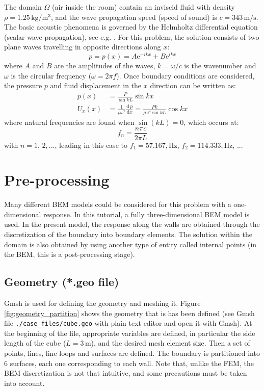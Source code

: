 \documentclass[a4]{article}
\begin{document}
The domain $\Omega$ (air inside the room) contain an inviscid fluid with density $\rho=1.25\,\mathrm{kg/m^3}$, and the wave propagation speed (speed of sound) is $c=343\,\mathrm{m/s}$. The basic acoustic phenomena is governed by the Helmholtz differential equation (scalar wave propagation), see e.g. \cite{dominguez,maeso}. For this problem, the solution consists of two plane waves travelling in opposite directions along $x$:
\begin{equation}
p=p\left(x\right) = A\mathrm{e}^{-ikx} + B\mathrm{e}^{ikx}
\end{equation}
where $A$ and $B$ are the amplitudes of the waves, $k=\omega/c$ is the wavenumber and $\omega$ is the circular frequency ($\omega=2\pi f$). Once boundary conditions are considered, the pressure $p$ and fluid displacement in the $x$ direction can be written as:
\begin{align}
p\left(x\right)   &= \frac{P}{\sin kL}\sin kx \\
U_x\left(x\right) &= \frac{1}{\rho\omega^2}\frac{\mathrm{d}\,p}{\mathrm{d}x} = \frac{Pk}{\rho\omega^2\sin kL}\cos kx
\end{align}
where natural frequencies are found when $\sin(kL)=0$, which occurs at:
\begin{equation}
f_n = \frac{n \pi c}{2 \pi L}
\end{equation}
with $n=1,\,2,...$, leading in this case to $f_1=57.167,\mathrm{Hz}$, $f_2=114.333,\mathrm{Hz}$, ...

\section{Pre-processing}

Many different BEM models could be considered for this problem with a one-dimensional response. In this tutorial, a fully three-dimensional BEM model is used. In the present model, the response along the walls are obtained through the discretization of the boundary into boundary elements. The solution within the domain is also obtained by using another type of entity called internal points (in the BEM, this is a post-processing stage).

\subsection{Geometry (*.geo file)}

Gmsh \cite{gmshweb} is used for defining the geometry and meshing it. Figure \ref{fig:geometry_partition} shows the geometry that is has been defined (see Gmsh file \texttt{./case\_files/cube.geo} with plain text editor and open it with Gmsh).  At the beginning of the file, appropriate variables are defined, in particular the side length of the cube ($L=3\,\mathrm{m}$), and the desired mesh element size. Then a set of points, lines, line loops and surfaces are defined. The boundary is partitioned into 6 surfaces, each one corresponding to each wall. Note that, unlike the FEM, the BEM discretization is not that intuitive, and some precautions must be taken into account.
\end{document}
